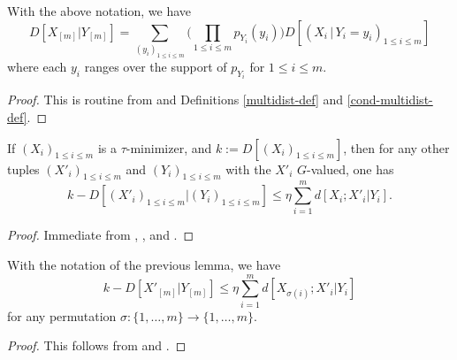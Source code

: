 \begin{lemma}\label{cond-multidist-alt}\leanok  With the above notation, we have
  \begin{equation}\label{multi-def-cond-alt}
    D[ X_{[m]} | Y_{[m]} ] = \sum_{(y_i)_{1 \leq i \leq m}} \biggl(\prod_{1 \leq i \leq m} p_{Y_i}(y_i)\biggr) D[ (X_i \,|\, Y_i \mathop{=}y_i)_{1 \leq i \leq m}]
  \end{equation}
  where each $y_i$ ranges over the support of $p_{Y_i}$ for $1 \leq i \leq m$.
\end{lemma}

\begin{proof}
  This is routine from  and Definitions \ref{multidist-def} and \ref{cond-multidist-def}.
\end{proof}

\begin{lemma}\label{cond-multidist-lower}\leanok  If  $(X_i)_{1 \leq i \leq m}$ is a $\tau$-minimizer, and $k := D[(X_i)_{1 \leq i \leq m}]$, then for any other tuples $(X'_i)_{1 \leq i \leq m}$ and $(Y_i)_{1 \leq i \leq m}$ with the $X'_i$ $G$-valued, one has
  $$ k - D[(X'_i)_{1 \leq i \leq m} | (Y_i)_{1 \leq i \leq m}] \leq \eta \sum_{i=1}^m d[X_i; X'_i|Y_i].$$
\end{lemma}

\begin{proof}
  Immediate from , , and .
\end{proof}

\begin{corollary}\label{cond-multidist-lower-II}\leanok With the notation of the previous lemma, we have
  \begin{equation}\label{5.3-conv}
    k - D[ X'_{[m]} | Y_{[m]} ] \leq \eta \sum_{i=1}^m d[X_{\sigma(i)};X'_i|Y_i]
  \end{equation}
for any permutation $\sigma : \{1,\dots,m\} \rightarrow \{1,\dots,m\}$.
\end{corollary}

\begin{proof}  This follows from  and .
\end{proof}

